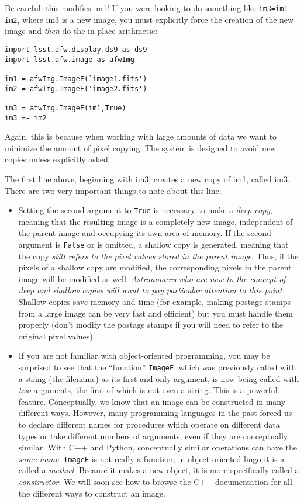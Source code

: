 \documentclass{book}
\begin{document}
Be careful: this modifies im1!  If you were looking to do something
like \texttt{im3=im1-im2}, where im3 is a new image, you must
explicitly force the creation of the new image and {\it then} do the
in-place arithmetic:

\begin{verbatim}
import lsst.afw.display.ds9 as ds9
import lsst.afw.image as afwImg

im1 = afwImg.ImageF(`image1.fits')
im2 = afwImg.ImageF('image2.fits')

im3 = afwImg.ImageF(im1,True)
im3 =- im2
\end{verbatim}

Again, this is because when working with large amounts of data we want
to minimize the amount of pixel copying.  The system is designed to
avoid new copies unless explicitly asked.

The first line above, beginning with im3, creates a new copy of im1, called im3.  There are
two very important things to note about this line:

\begin{itemize}

\item Setting the second argument to \texttt{True} is necessary to
  make a {\it deep copy}, meaning that the resulting image is a
  completely new image, independent of the parent image and occupying
  its own area of memory.  If the second argument is \texttt{False} or
  is omitted, a shallow copy is generated, meaning that the copy {\it
    still refers to the pixel values stored in the parent image}.
  Thus, if the pixels of a shallow copy are modified, the
  corresponding pixels in the parent image will be modified as well.
  {\it Astronomers who are new to the concept of deep and shallow
    copies will want to pay particular attention to this point.}
  Shallow copies save memory and time (for example, making postage
  stamps from a large image can be very fast and efficient) but you
  must handle them properly (don't modify the postage stamps if you
  will need to refer to the original pixel values).

\item If you are not familiar with object-oriented programming, you
  may be surprised to see that the ``function'' \texttt{ImageF}, which
  was previously called with a string (the filename) as its first and
  only argument, is now being called with {\it two} arguments, the
  first of which is not even a string.  This is a powerful
  feature. Conceptually, we know that an image can be constructed in
  many different ways.  However, many programming languages in the
  past forced us to declare different names for procedures which
  operate on different data types or take different numbers of
  arguments, even if they are conceptually similar.  With C++ and
  Python, conceptually similar operations can have the {\it same
    name}.  \texttt{ImageF} is not really a function; in
  object-oriented lingo it is a called a {\it method}.  Because it
  makes a new object, it is more specifically called a {\it
    constructor}.  We will soon see how to browse the C++
  documentation for all the different ways to construct an image.

\end{itemize}
\end{document}
